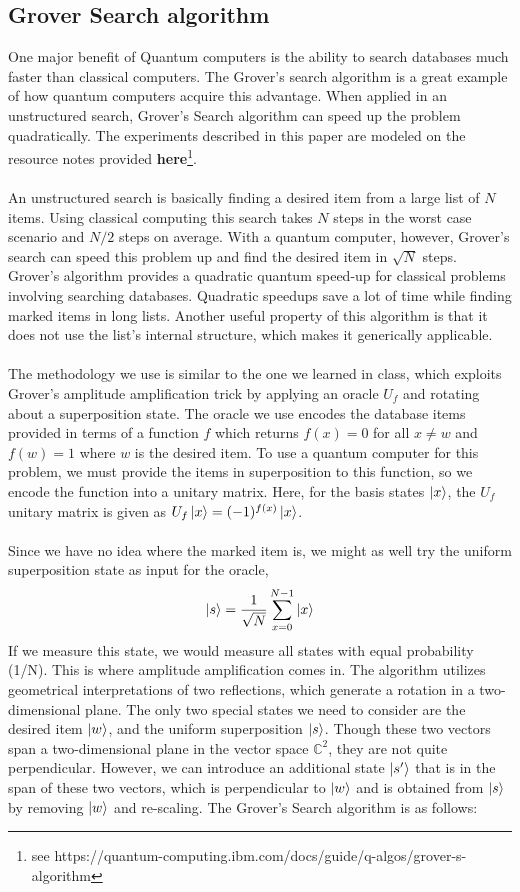 \documentclass[12pt]{article}
\begin{document}
    \subsection{Grover Search algorithm}
    One major benefit of Quantum computers is the ability to search databases much faster than classical computers. The Grover's search algorithm is a great example of how quantum computers acquire this advantage. When applied in an unstructured search, Grover's Search algorithm can speed up the problem quadratically. The experiments described in this paper are modeled on the resource notes provided \textbf{here}\footnote{see https://quantum-computing.ibm.com/docs/guide/q-algos/grover-s-algorithm}. 
    \\
    \smallskip
    \\
    An unstructured search is basically finding a desired item from a large list of $N$ items. Using classical computing this search takes $N$ steps in the worst case scenario and $N/2$ steps on average. With a quantum computer, however, Grover’s search can speed this problem up and find the desired item in $\sqrt{N}$ steps. Grover’s algorithm provides a quadratic quantum speed-up for classical problems involving searching databases. Quadratic speedups save a lot of time while finding marked items in long lists. Another useful property of this algorithm is that it does not use the list’s internal structure, which makes it generically applicable.
    \\
    \smallskip
    \\
    The methodology we use is similar to the one we learned in class, which exploits Grover’s amplitude amplification trick by applying an oracle $U_f$ and rotating about a superposition state. The oracle we use encodes the database items provided in terms of a function $f$ which returns $f(x) = 0$ for all $x \neq w$ and $f(w) = 1$ where $w$ is the desired item. To use a quantum computer for this problem, we must provide the items in superposition to this function, so we encode the function into a unitary matrix. Here, for the basis states $\ket{x}$, the $U_f$ unitary matrix is given as $U_f \ket{x} = (-1)^{f(x)} \ket{x}$.
    \\
    \smallskip
    \\
    Since we have no idea where the marked item is, we might as well try the uniform superposition state as input for the oracle, $$\ket{s} = \frac{1}{\sqrt{N}}\sum^{N-1}_{x=0}\ket{x}$$
    \noindent
    If we measure this state, we would measure all states with equal probability (1/N). This is where amplitude amplification comes in. The algorithm utilizes geometrical interpretations of two reflections, which generate a rotation in a two-dimensional plane. The only two special states we need to consider are the desired item $\ket{w}$,  and the uniform superposition $\ket{s}$. Though these two vectors span a two-dimensional plane in the vector space $\mathbb{C}^2$, they are not quite perpendicular. However, we can introduce an additional state $\ket{s^\prime}$  that is in the span of these two vectors, which is perpendicular to $\ket{w}$ and is obtained from $\ket{s}$ by removing $\ket{w}$ and re-scaling. The Grover’s Search algorithm is as follows:
    
\end{document}
